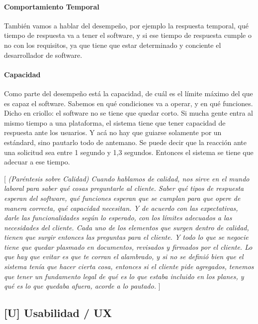 \paragraph{Comportamiento Temporal}
También vamos a hablar del
desempeño, por ejemplo la respuesta temporal, qué tiempo de respuesta va
a tener el software, y si ese tiempo de respuesta cumple o no con los
requisitos, ya que tiene que estar determinado y conciente el
desarrollador de software.

\hypertarget{capacidad}{%
\paragraph{Capacidad}\label{capacidad}}

Como parte del desempeño está la capacidad, de cuál es el límite máximo
del que es capaz el software. Sabemos en qué condiciones va a operar, y
en qué funciones. Dicho en criollo: el software no se tiene que quedar
corto. Si mucha gente entra al mismo tiempo a una plataforma, el sistema
tiene que tener capacidad de respuesta ante los usuarios. Y acá no hay
que guiarse solamente por un estándard, sino pautarlo todo de antemano.
Se puede decir que la reacción ante una solicitud sea entre 1 segundo y
1,3 segundos. Entonces el sistema se tiene que adecuar a ese tiempo.

{[}%
{\slshape
(Paréntesis sobre Calidad) Cuando hablamos de calidad, nos sirve en el
mundo laboral para saber qué cosas preguntarle al cliente. Saber qué
tipos de respuesta esperan del software, qué funciones esperan que se
cumplan para que opere de manera correcta, qué capacidad necesitan. Y de
acuerdo con las expectativas, darle las funcionalidades según lo
esperado, con los límites adecuados a las necesidades del cliente. Cada
uno de los elementos que surgen dentro de calidad, tienen que surgir
entonces las preguntas para el cliente. Y todo lo que se negocie tiene
que quedar plasmado en documentos, revisados y firmados por el cliente.
Lo que hay que evitar es que te corran el alambrado, y si no se definió
bien que el sistema tenía que hacer cierta cosa, entonces si el cliente
pide agregados, tenemos que tener un fundamento legal de qué es lo que
estaba incluido en los planes, y qué es lo que quedaba afuera, acorde a
lo pautado.%
}%
{]}

\hypertarget{usabilidad-u}{%
\subsection{%
{[}U{]}
Usabilidad / UX
}\label{usabilidad-u}}

